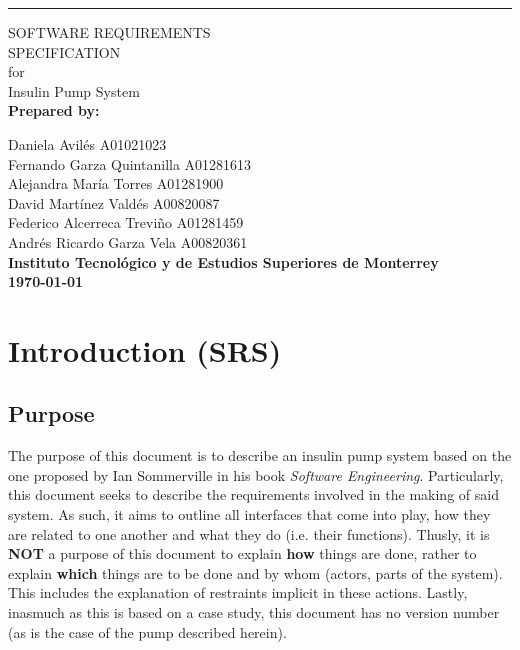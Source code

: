 \documentclass{scrreprt}
\date{}
\begin{document}
\begin{flushright}
    \rule{16cm}{5pt}\vskip1cm
    \begin{bfseries}
        \Huge{SOFTWARE REQUIREMENTS\\ SPECIFICATION}\\
        \vspace{1cm}
        for\\
        \vspace{1cm}
        Insulin Pump System\\
        \vspace{2cm}
        \Large \textbf{Prepared by:}\\
    \end{bfseries}
        \Large
            Daniela Avil\'{e}s A01021023\\
            Fernando Garza Quintanilla A01281613\\
            Alejandra María Torres A01281900\\
            David Martínez Vald\'{e}s A00820087\\
            Federico Alcerreca Treviño A01281459\\
            Andr\'{e}s Ricardo Garza Vela A00820361\\
        \vspace{2cm}
        \textbf{\Large Instituto Tecnológico y de Estudios Superiores de Monterrey}\\
        \vspace{2cm}
        \textbf{\today}\\
\end{flushright}

\tableofcontents

\chapter{Introduction (SRS)}

\section{Purpose}
The purpose of this document is to describe an insulin pump system based on the one proposed by Ian Sommerville in his book \textsl{Software Engineering}. Particularly, this document seeks to describe the 
requirements involved in the making of said system. As such, it aims to outline all interfaces that come into play, how they are related to one another and what they do (i.e. their functions). Thusly, it is \textbf{NOT}
a purpose of this document to explain \textbf{how} things are done, rather to explain \textbf{which} things are to be done and by whom (\glspl{actor}, parts of the system). This includes the explanation of restraints
implicit in these actions. Lastly, inasmuch as this is based on a case study, this document has no version number (as is the case of the pump described herein).
\end{document}
